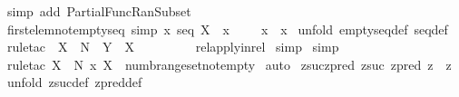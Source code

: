 \begin{isabellebody}
\isamarkupfalse%
\ {\isacharparenleft}simp\ add{\isacharcolon}\ Partial{\isacharunderscore}Func{\isacharunderscore}Ran{\isacharunderscore}Subset{\isacharparenright}\isanewline
{}\isamarkupfalse%
%
\endisatagproof
{\isafoldproof}%
%
\isadelimproof
\isanewline
%
\endisadelimproof
\isanewline
\isanewline
{}\isamarkupfalse%
\ first{\isacharunderscore}elem{\isacharunderscore}notemptyseq\ {\isacharbrackleft}simp{\isacharbrackright}{\isacharcolon}\ {\isachardoublequoteopen}{\isacharbrackleft}{\isacharbar}x{\isacharcolon}\ seq\ X\ {\isacharsemicolon}\ x\ {\isachartilde}{\isacharequal}\ {\isacharpercent}{\isacharless}{\isacharpercent}{\isachargreater}{\isacharbar}{\isacharbrackright}\ {\isacharequal}{\isacharequal}{\isachargreater}\ {\isacharparenleft}{}{\isacharcomma}\ x{\isacharpercent}{\isacharcircum}{}{\isacharparenright}\ {\isacharcolon}\ x{\isachardoublequoteclose}\isanewline
%
\isadelimproof
%
\endisadelimproof
%
\isatagproof
{}\isamarkupfalse%
\ {\isacharparenleft}unfold\ emptyseq{\isacharunderscore}def\ seq{\isacharunderscore}def{\isacharparenright}\isanewline
{}\isamarkupfalse%
\ {\isacharparenleft}rule{\isacharunderscore}tac\ \ X\ {\isacharequal}\ {\isachardoublequoteopen}{\isacharpercent}N{\isachardoublequoteclose}\ \ Y\ {\isacharequal}\ {\isachardoublequoteopen}X{\isachardoublequoteclose}\ \isanewline
\ \ \ \ \ \ \ \ rel{\isacharunderscore}apply{\isacharunderscore}in{\isacharunderscore}rel{\isacharparenright}\isanewline
{}\isamarkupfalse%
\ simp\isanewline
{}\isamarkupfalse%
\ simp\isanewline
{}\isamarkupfalse%
\ {\isacharparenleft}rule{\isacharunderscore}tac\ X\ {\isacharequal}\ {\isachardoublequoteopen}{\isacharpercent}N\ {\isacharpercent}x\ X{\isachardoublequoteclose}\ \ numb{\isacharunderscore}range{\isacharunderscore}set{\isacharunderscore}notempty{\isacharparenright}\isanewline
{}\isamarkupfalse%
\ auto\isanewline
{}\isamarkupfalse%
%
\endisatagproof
{\isafoldproof}%
%
\isadelimproof
\isanewline
%
\endisadelimproof
\isanewline
{}\isamarkupfalse%
\ zsuc{\isacharunderscore}zpred{\isacharcolon}\ {\isachardoublequoteopen}zsuc{\isacharparenleft}\ zpred\ z{\isacharparenright}\ {\isacharequal}\ z{\isachardoublequoteclose}\isanewline
%
\isadelimproof
%
\endisadelimproof
%
\isatagproof
{}\isamarkupfalse%
\ {\isacharparenleft}unfold\ zsuc{\isacharunderscore}def\ zpred{\isacharunderscore}def{\isacharparenright}\isanewline

\end{isabellebody}
